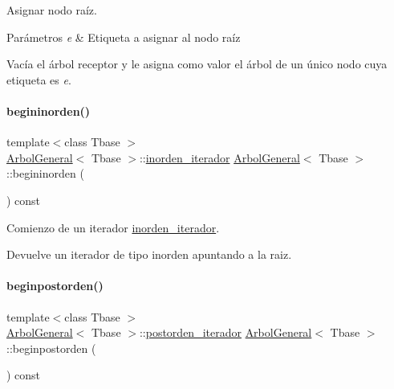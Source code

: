 Asignar nodo raíz. 


\begin{DoxyParams}{Parámetros}
{\em e} & Etiqueta a asignar al nodo raíz\\
\hline
\end{DoxyParams}
Vacía el árbol receptor y le asigna como valor el árbol de un único nodo cuya etiqueta es {\itshape e}. \hypertarget{classArbolGeneral_addc9cdf77ec43de8669989f18bfbb6fa}{}\label{classArbolGeneral_addc9cdf77ec43de8669989f18bfbb6fa} 
\paragraph{\texorpdfstring{begininorden()}{begininorden()}}
{\footnotesize\ttfamily template$<$class Tbase $>$ \\
\hyperlink{classArbolGeneral}{Arbol\+General}$<$ Tbase $>$\+::\hyperlink{classArbolGeneral_1_1inorden__iterador}{inorden\+\_\+iterador} \hyperlink{classArbolGeneral}{Arbol\+General}$<$ Tbase $>$\+::begininorden (\begin{DoxyParamCaption}{ }\end{DoxyParamCaption}) const}



Comienzo de un iterador \hyperlink{classArbolGeneral_1_1inorden__iterador}{inorden\+\_\+iterador}. 

\begin{DoxyReturn}{Devuelve}
un iterador de tipo inorden apuntando a la raiz. 
\end{DoxyReturn}
\hypertarget{classArbolGeneral_a59f2bce358114242dcb07d4c7974cb2f}{}\label{classArbolGeneral_a59f2bce358114242dcb07d4c7974cb2f} 
\paragraph{\texorpdfstring{beginpostorden()}{beginpostorden()}}
{\footnotesize\ttfamily template$<$class Tbase $>$ \\
\hyperlink{classArbolGeneral}{Arbol\+General}$<$ Tbase $>$\+::\hyperlink{classArbolGeneral_1_1postorden__iterador}{postorden\+\_\+iterador} \hyperlink{classArbolGeneral}{Arbol\+General}$<$ Tbase $>$\+::beginpostorden (\begin{DoxyParamCaption}{ }\end{DoxyParamCaption}) const}



